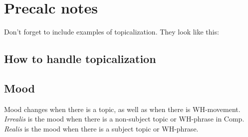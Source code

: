 \documentclass[12pt]{article}
\begin{document}
\section*{Precalc notes}

Don't forget to include examples of topicalization.
They look like this:

\subsection*{How to handle topicalization}

\subsection*{Mood}

Mood changes when there is a topic, as well as when
there is WH-movement.  \emph{Irrealis} is the mood when
there is a non-subject topic or WH-phrase in Comp.
\emph{Realis} is the mood when there is a subject topic
or WH-phrase.
\end{document}
